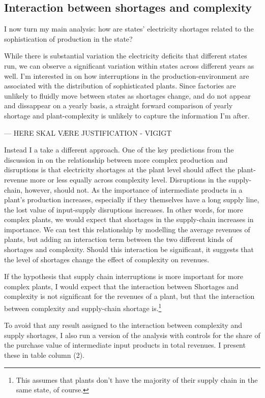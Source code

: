 \documentclass[11pt]{article}
\begin{document}
\subsection{Interaction between shortages and complexity}%
\label{sub:regressions}

I now turn my main analysis: how are states' electricity shortages related to the sophistication of production in the state? 

While there is substantial variation the electricity deficits that different states run, we can observe a significant variation within states across different years as well. I'm interested in on how interruptions in the production-environment are associated with the distribution of sophisticated plants. Since factories are unlikely to fluidly move between states as shortages change, and do not appear and dissappear on a yearly basis, a straight forward comparison of yearly shortage and plant-complexity is unlikely to capture the information I'm after. 

 --- HERE SKAL VÆRE JUSTIFICATION - VIGIGT

 Instead I a take a different approach. One of the key predictions from the discussion in on the relationship between more complex production and disruptions is that electricity shortages at the plant level should affect the plant-revenue more or less equally across complexity level. Disruptions in the supply-chain, however, should not. As the importance of intermediate products in a plant's production increases, especially if they themselves have a long supply line, the lost value of input-supply disruptions increases. In other words, for more complex plants, we would expect that shortages in the supply-chain increases in importance. We can test this relationship by modelling the average revenues of plants, but adding an interaction term between the two different kinds of shortages and complexity. Should this interaction be significant, it suggests that the level of shortages change the effect of complexity on revenues.

 If the hypothesis that supply chain interruptions is more important for more complex plants, I would expect that the interaction between Shortages and complexity is not significant for the revenues of a plant, but that the interaction between complexity and supply-chain shortage is.\footnote{This assumes that plants don't have the majority of their supply chain in the same state, of course.}

 To avoid that any result assigned to the interaction between complexity and supply shortages, I also run a version of the analysis with controls for the share of the purchase value of intermediate input products in total revenues. I present these in table \label{tab:interaction_wage_input} column (2).
\end{document}
